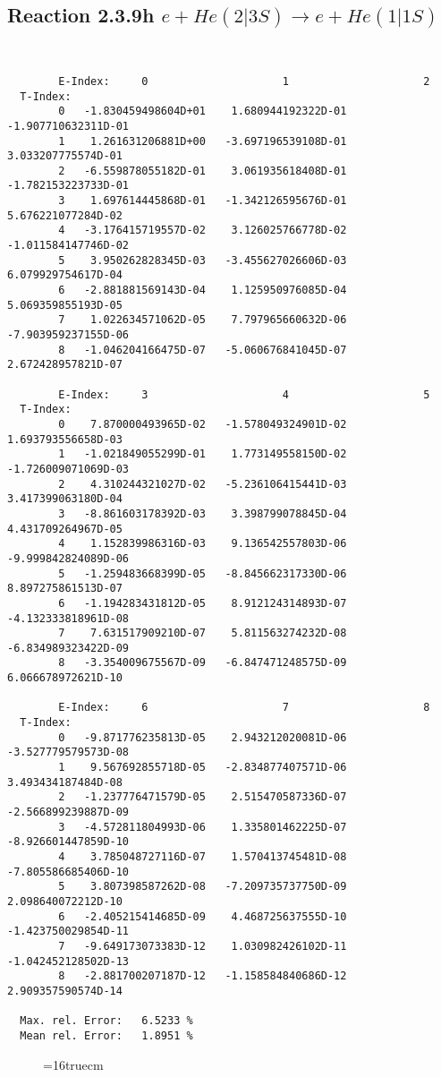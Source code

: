 \documentclass[12pt]{article}
\begin{document}
\subsection{
Reaction 2.3.9h  $e + He(2|3S) \rightarrow e + He(1|1S) $
}


\begin{small}\begin{verbatim}


        E-Index:     0                     1                     2
  T-Index:
        0   -1.830459498604D+01    1.680944192322D-01   -1.907710632311D-01
        1    1.261631206881D+00   -3.697196539108D-01    3.033207775574D-01
        2   -6.559878055182D-01    3.061935618408D-01   -1.782153223733D-01
        3    1.697614445868D-01   -1.342126595676D-01    5.676221077284D-02
        4   -3.176415719557D-02    3.126025766778D-02   -1.011584147746D-02
        5    3.950262828345D-03   -3.455627026606D-03    6.079929754617D-04
        6   -2.881881569143D-04    1.125950976085D-04    5.069359855193D-05
        7    1.022634571062D-05    7.797965660632D-06   -7.903959237155D-06
        8   -1.046204166475D-07   -5.060676841045D-07    2.672428957821D-07

        E-Index:     3                     4                     5
  T-Index:
        0    7.870000493965D-02   -1.578049324901D-02    1.693793556658D-03
        1   -1.021849055299D-01    1.773149558150D-02   -1.726009071069D-03
        2    4.310244321027D-02   -5.236106415441D-03    3.417399063180D-04
        3   -8.861603178392D-03    3.398799078845D-04    4.431709264967D-05
        4    1.152839986316D-03    9.136542557803D-06   -9.999842824089D-06
        5   -1.259483668399D-05   -8.845662317330D-06    8.897275861513D-07
        6   -1.194283431812D-05    8.912124314893D-07   -4.132333818961D-08
        7    7.631517909210D-07    5.811563274232D-08   -6.834989323422D-09
        8   -3.354009675567D-09   -6.847471248575D-09    6.066678972621D-10

        E-Index:     6                     7                     8
  T-Index:
        0   -9.871776235813D-05    2.943212020081D-06   -3.527779579573D-08
        1    9.567692855718D-05   -2.834877407571D-06    3.493434187484D-08
        2   -1.237776471579D-05    2.515470587336D-07   -2.566899239887D-09
        3   -4.572811804993D-06    1.335801462225D-07   -8.926601447859D-10
        4    3.785048727116D-07    1.570413745481D-08   -7.805586685406D-10
        5    3.807398587262D-08   -7.209735737750D-09    2.098640072212D-10
        6   -2.405215414685D-09    4.468725637555D-10   -1.423750029854D-11
        7   -9.649173073383D-12    1.030982426102D-11   -1.042452128502D-13
        8   -2.881700207187D-12   -1.158584840686D-12    2.909357590574D-14

  Max. rel. Error:   6.5233 %
  Mean rel. Error:   1.8951 %

\end{verbatim}\end{small}
\begin{figure} \label{2.3.9h}
\epsfxsize=16truecm
\end{figure}
\newpage
\end{document}
